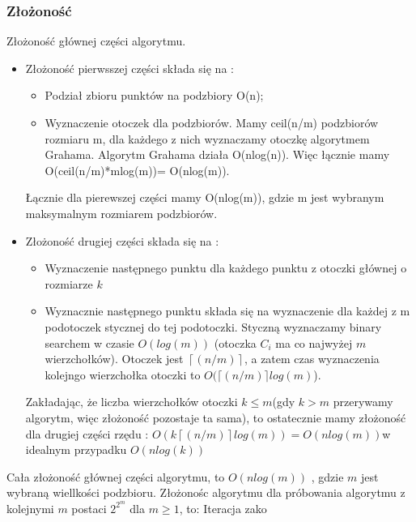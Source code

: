 \documentclass[11pt]{article}
\theoremstyle{remark} \newtheorem{definition}{def.}
\theoremstyle{definition} \newtheorem{twierdzenie}{tw.}
\begin{document}
    \subsubsection{Złożoność}
    Złożoność głównej części algorytmu.
    \begin{itemize}
        \item Złożoność pierwsszej części składa się na :
                \begin{itemize}
                    \item   Podział zbioru punktów na podzbiory O(n);
                    \item   Wyznaczenie otoczek dla podzbiorów. Mamy ceil(n/m) podzbiorów
                            rozmiaru m, dla każdego z nich wyznaczamy otoczkę algorytmem Grahama.
                            Algorytm Grahama działa O(nlog(n)). Więc łącznie mamy O(ceil(n/m)*mlog(m))=
                            O(nlog(m)).
                \end{itemize}
                Łącznie dla pierewszej części mamy O(nlog(m)), gdzie m jest wybranym maksymalnym
                 rozmiarem podzbiorów.

        \item Złożoność drugiej części składa się na :
                 \begin{itemize}
                     \item   Wyznaczenie następnego punktu dla każdego punktu z otoczki głównej o rozmiarze $k$
                     \item   Wyznacznie następnego punktu składa się na wyznaczenie dla każdej z m podotoczek
                            stycznej do tej podotoczki. Styczną wyznaczamy binary searchem w czasie $O(log(m))$
                            (otoczka $C_i$ ma co najwyżej $m$ wierzchołków). Otoczek jest $\left\lceil(n/m) \right\rceil$, a zatem czas
                            wyznaczenia kolejngo wierzchołka otoczki to $O(\lceil(n/m)\rceil log(m)$).    
                 \end{itemize}
                 Zakładając, że liczba wierzchołków otoczki $k \le m$(gdy $k > m$ przerywamy algorytm, więc złożoność pozostaje ta sama),
                  to ostatecznie mamy złożoność dla drugiej części rzędu : $O(k \left\lceil(n/m)\right\rceil log(m)) = O(nlog(m)) $w idealnym przypadku $O(nlog(k))$
    \end{itemize}

    Cała złożoność głównej części algorytmu, to $O(nlog(m))$ , gdzie $m$ jest wybraną wiellkości podzbioru.
    Złożonośc algorytmu dla próbowania algorytmu z kolejnymi $m$ postaci $2^{2^m}$ dla $m \ge 1$, to:
    Iteracja zako
\end{document}
